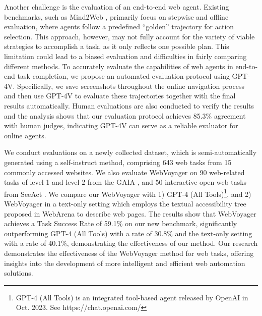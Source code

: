 \documentclass[11pt]{article}
\begin{document}
Another challenge is the evaluation of an end-to-end web agent. 
Existing benchmarks, such as Mind2Web \citep{deng2023mind2web}, primarily focus on stepwise and offline evaluation, where agents follow a predefined ``golden'' trajectory for action selection. 
This approach, however, may not fully account for the variety of viable strategies to accomplish a task, as it only reflects one possible plan. This limitation could lead to a biased evaluation and difficulties in fairly comparing different methods.
To accurately evaluate the capabilities of web agents in end-to-end task completion, we propose an automated evaluation protocol using GPT-4V. 
Specifically, we save screenshots throughout the online navigation process and then use GPT-4V to evaluate these trajectories together with the final results automatically.
Human evaluations are also conducted to verify the results and 
the analysis shows that our evaluation protocol achieves 85.3\% agreement with human judges, indicating GPT-4V can serve as a reliable evaluator for online agents.


We conduct evaluations on a newly collected dataset, which is semi-automatically generated using a self-instruct \citep{wang2022self} method, comprising 643 web tasks from 15 commonly accessed websites. We also evaluate WebVoyager on 90 web-related tasks of level 1 and level 2 from the GAIA \citep{mialon2023gaia}, and 50 interactive open-web tasks from SeeAct \cite{zheng2024gpt}.  
We compare our WebVoyager with 1) GPT-4 (All Tools)\footnote{GPT-4 (All Tools) is an integrated tool-based agent 
released by OpenAI in Oct. 2023. See https://chat.openai.com/}, and 2) WebVoyager in a text-only setting which employs the textual accessibility tree proposed in WebArena  \citep{zhou2023webarena} to describe web pages. 
The results show that WebVoyager achieves a Task Success Rate of 59.1\% on our new benchmark, significantly outperforming GPT-4 (All Tools) with a rate of 30.8\% and the text-only setting with a rate of 40.1\%, demonstrating the effectiveness of our method. 
Our research demonstrates the effectiveness of the WebVoyager method for web tasks, offering insights into the development of more intelligent and efficient web automation solutions.
\end{document}
